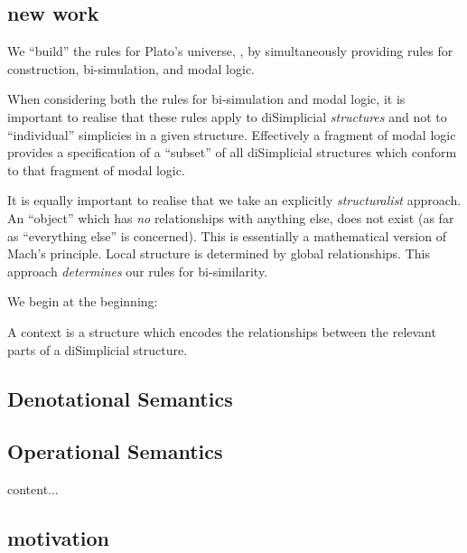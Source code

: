\documentclass[a4paper,openany]{amsbook}
\begin{document}
\subsection{new work}

We ``build'' the rules for Plato's universe, \Universe, by simultaneously providing rules
for construction, bi-simulation, and modal logic.

When considering both the rules for bi-simulation and modal logic, it is important to
realise that these rules apply to diSimplicial \emph{structures} and not to ``individual''
simplicies in a given structure. Effectively a fragment of modal logic provides a
specification of a ``subset'' of all diSimplicial structures which conform to that
fragment of modal logic.

It is equally important to realise that we take an explicitly \emph{structuralist}
approach. An ``object'' which has \emph{no} relationships with anything else, does not
exist (as far as ``everything else'' is concerned). This is essentially a mathematical 
version of Mach's principle. Local structure is determined by global relationships.  This 
approach \emph{determines} our rules for bi-similarity.

We begin at the beginning:

A context is a structure which encodes the relationships between the relevant parts of a 
diSimplicial structure.


\begin{prooftree}
\end{prooftree}



\subsection{Denotational Semantics}



\subsection{Operational Semantics}



\begin{definition}
content...
\end{definition}

\subsection{motivation}
\end{document}
